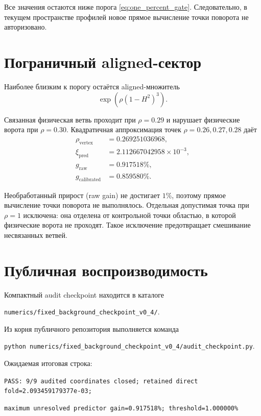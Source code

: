 \documentclass[11pt,a4paper]{article}
\newcommand{\host}{H}
\begin{document}
Все значения остаются ниже порога \eqref{eq:one_percent_gate}. Следовательно, в текущем пространстве профилей новое прямое вычисление точки поворота не авторизовано.

\section{Пограничный aligned-сектор}

Наиболее близким к порогу остаётся aligned-множитель
\begin{equation}
\exp\!\left(\rho\left(1-\host^2\right)^3\right).
\end{equation}

Связанная физическая ветвь проходит при $\rho=0.29$ и нарушает физические ворота при $\rho=0.30$. Квадратичная аппроксимация точек $\rho=0.26,0.27,0.28$ даёт
\begin{align}
\rho_{\mathrm{vertex}} &= 0.269251036968, \\
\xi_{\mathrm{pred}} &= 2.112667042958\times10^{-3}, \\
g_{\mathrm{raw}} &= 0.917518\%, \\
g_{\mathrm{calibrated}} &= 0.859580\%.
\end{align}

Необработанный прирост (raw gain) не достигает $1\%$, поэтому прямое вычисление точки поворота не выполнялось. Отдельная допустимая точка при $\rho=1$ исключена: она отделена от контрольной точки областью, в которой физические ворота не проходят. Такое исключение предотвращает смешивание несвязанных ветвей.

\section{Публичная воспроизводимость}

Компактный audit checkpoint находится в каталоге
\begin{center}
\texttt{numerics/fixed\_background\_checkpoint\_v0\_4/}.
\end{center}

Из корня публичного репозитория выполняется команда
\begin{center}
\texttt{python numerics/fixed\_background\_checkpoint\_v0\_4/audit\_checkpoint.py}.
\end{center}

Ожидаемая итоговая строка:
\begin{center}
\small
\texttt{PASS: 9/9 audited coordinates closed; retained direct fold=2.093459179377e-03;}

\texttt{maximum unresolved predictor gain=0.917518\%; threshold=1.000000\%}
\end{center}
\end{document}
